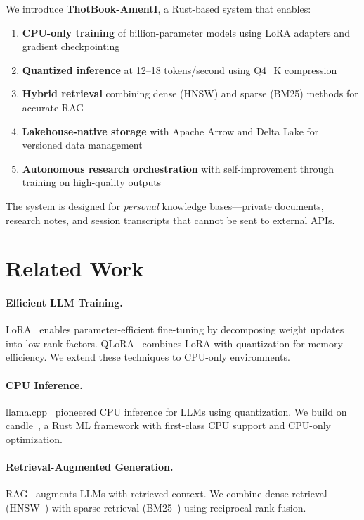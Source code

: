 \documentclass[11pt,a4paper]{article}
\theoremstyle{plain}
\theoremstyle{definition}
\begin{document}
We introduce \textbf{ThotBook-AmentI}, a Rust-based system that enables:

\begin{enumerate}
    \item \textbf{CPU-only training} of billion-parameter models using LoRA
          adapters and gradient checkpointing
    \item \textbf{Quantized inference} at 12--18 tokens/second using Q4\_K
          compression
    \item \textbf{Hybrid retrieval} combining dense (HNSW) and sparse (BM25)
          methods for accurate RAG
    \item \textbf{Lakehouse-native storage} with Apache Arrow and Delta Lake
          for versioned data management
    \item \textbf{Autonomous research orchestration} with self-improvement
          through training on high-quality outputs
\end{enumerate}

The system is designed for \emph{personal} knowledge bases---private documents,
research notes, and session transcripts that cannot be sent to external APIs.

\section{Related Work}
\label{sec:related}

\paragraph{Efficient LLM Training.}
LoRA~\cite{hu2022lora} enables parameter-efficient fine-tuning by decomposing
weight updates into low-rank factors. QLoRA~\cite{dettmers2023qlora} combines
LoRA with quantization for memory efficiency. We extend these techniques to
CPU-only environments.

\paragraph{CPU Inference.}
llama.cpp~\cite{llamacpp} pioneered CPU inference for LLMs using quantization.
We build on candle~\cite{candle}, a Rust ML framework with first-class CPU
support and CPU-only optimization.

\paragraph{Retrieval-Augmented Generation.}
RAG~\cite{lewis2020rag} augments LLMs with retrieved context. We combine dense
retrieval (HNSW~\cite{malkov2018hnsw}) with sparse retrieval (BM25~\cite{robertson2009bm25})
using reciprocal rank fusion.
\end{document}
